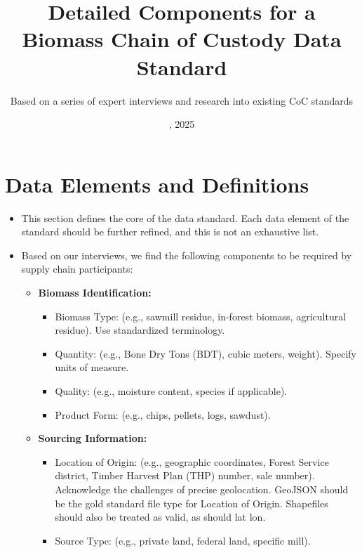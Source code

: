\documentclass[a4paper, 11pt]{article}
\begin{document}
\title{Detailed Components for a Biomass Chain of Custody Data Standard}
\author{Based on a series of expert interviews and research into existing CoC standards} %
\date{\monthname, 2025} %
\maketitle

\section{Data Elements and Definitions}

\begin{itemize}
    \item This section defines the core of the data standard. Each data element of the standard should be further refined, and this is not an exhaustive list.
    \item Based on our interviews, we find the following components to be required by supply chain participants:
        \begin{itemize} %
            \item \textbf{Biomass Identification:}
                \begin{itemize} %
                    \item Biomass Type: (e.g., sawmill residue, in-forest biomass, agricultural residue). Use standardized terminology.
                    \item Quantity: (e.g., Bone Dry Tons (BDT), cubic meters, weight). Specify units of measure.
                    \item Quality: (e.g., moisture content, species if applicable).
                    \item Product Form: (e.g., chips, pellets, logs, sawdust).
                \end{itemize}
            \item \textbf{Sourcing Information:}
                \begin{itemize} %
                    \item Location of Origin: (e.g., geographic coordinates, Forest Service district, Timber Harvest Plan (THP) number, sale number). Acknowledge the challenges of precise geolocation. GeoJSON should be the gold standard file type for Location of Origin. Shapefiles should also be treated as valid, as should lat lon. 
                    \item Source Type: (e.g., private land, federal land, specific mill).

\end{itemize}
\end{itemize}
\end{itemize}
\end{document}
